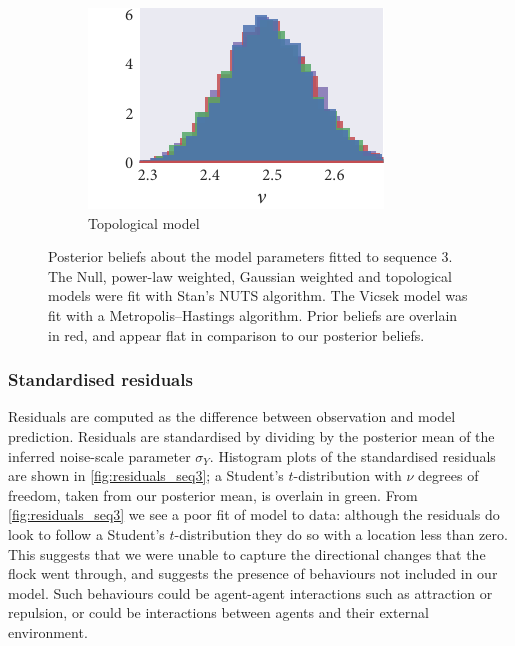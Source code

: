 \begin{figure}[p]
\begin{subfigure}[b]{\textwidth}
    \includegraphics{seq3/top_hist_nu.pdf}%
    \caption{Topological model}
  \end{subfigure}
  \vspace{-2em}
  \caption{Posterior beliefs about the model parameters fitted to sequence $3$.
    The Null, power-law weighted, Gaussian weighted and topological models were
    fit with Stan's NUTS algorithm. The Vicsek model was fit with a
    Metropolis--Hastings algorithm. Prior beliefs are overlain in red, and
    appear flat in comparison to our posterior beliefs.}
  \label{fig:posteriors_seq3}
\end{figure}

\subsubsection{Standardised residuals}

Residuals are computed as the difference between observation and model
prediction. Residuals are standardised by dividing by the posterior mean of the
inferred noise-scale parameter $\sigma_Y$. Histogram plots of the standardised
residuals are shown in \cref{fig:residuals_seq3}; a Student's $t$-distribution
with $\nu$ degrees of freedom, taken from our posterior mean, is overlain in
green. From \cref{fig:residuals_seq3} we see a poor fit of model to data:
although the residuals do look to follow a Student's $t$-distribution they do
so with a location less than zero. This suggests that we were unable to capture
the directional changes that the flock went through, and suggests the presence
of behaviours not included in our model. Such behaviours could be agent-agent
interactions such as attraction or repulsion, or could be interactions between
agents and their external environment.

